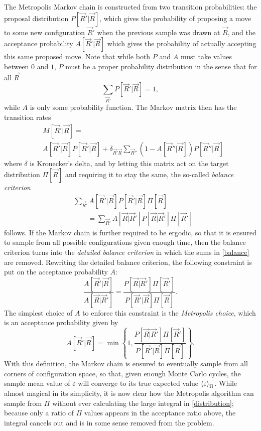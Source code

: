 \documentclass[a4paper,8pt]{article}
\begin{document}
\begin{multicols}{2}
The Metropolis Markov chain is constructed from two transition probabilities: the proposal distribution $P[\vec{R}'|\vec{R}]$, which gives the probability of proposing a move to some new configuration $\vec{R}'$ when the previous sample was drawn at $\vec{R}$, and the acceptance probability $A[\vec{R}'|\vec{R}]$ which gives the probability of actually accepting this same proposed move. Note that while both $P$ and $A$ must take values between $0$ and $1$, $P$ must be a proper probability distribution in the sense that for all $\vec{R}$
\begin{equation}\label{propdistcint}
\sum\limits_{\vec{R}'} P[\vec{R}'|\vec{R}] = 1,
\end{equation}
while $A$ is only some probability function. The Markov matrix then has the transition rates
\begin{align}
&M[\vec{R}'|\vec{R}] = \nonumber\\
&A[\vec{R}'|\vec{R}]P[\vec{R}'|\vec{R}] + \delta_{\vec{R}'\vec{R}}\sum\limits_{\vec{R}''} \left(1-A[\vec{R}''|\vec{R}]\right)P[\vec{R}''|\vec{R}]
\end{align}
where $\delta$ is Kronecker's delta, and by letting this matrix act on the target distribution $\Pi[\vec{R}]$ and requiring it to stay the same, the so-called \textit{balance criterion} 
\begin{align}\label{balance}
&\sum\limits_{\vec{R}'} A[\vec{R}'|\vec{R}]P[\vec{R}'|\vec{R}]\Pi[\vec{R}] \nonumber\\
&\qquad = \sum\limits_{\vec{R}'} A[\vec{R}|\vec{R}']P[\vec{R}|\vec{R}']\Pi[\vec{R}']  
\end{align}
follows. If the Markov chain is further required to be ergodic, so that it is ensured to sample from all possible configurations given enough time, then the balance criterion turns into the \textit{detailed balance criterion} in which the sums in \eqref{balance} are removed. Rewriting the detailed balance criterion, the following constraint is put on the acceptance probability $A$:
\begin{equation}\label{accprobcint}
\frac{A[\vec{R}'|\vec{R}]}{A[\vec{R}|\vec{R}']} = \frac{P[\vec{R}|\vec{R}']\Pi[\vec{R}']}{P[\vec{R}'|\vec{R}]\Pi[\vec{R}]}.
\end{equation}
The simplest choice of $A$ to enforce this constraint is the \textit{Metropolis choice}, which is an acceptance probability given by
\begin{equation}\label{accprob}
A[\vec{R}'|\vec{R}] = \min\left\{1,\frac{P[\vec{R}|\vec{R}']\Pi[\vec{R}']}{P[\vec{R}'|\vec{R}]\Pi[\vec{R}]}\right\}.
\end{equation}
With this definition, the Markov chain is ensured to eventually sample from all corners of configuration space, so that, given enough Monte Carlo cycles, the sample mean value of $\varepsilon$ will converge to its true expected value $\ev{\varepsilon}_\Pi$. While almost magical in its simplicity, it is now clear how the Metropolis algorithm can sample from $\Pi$ without ever calculating the large integral in \eqref{distribution}; because only a ratio of $\Pi$ values appears in the acceptance ratio above, the integral cancels out and is in some sense removed from the problem.


\end{multicols}
\end{document}
